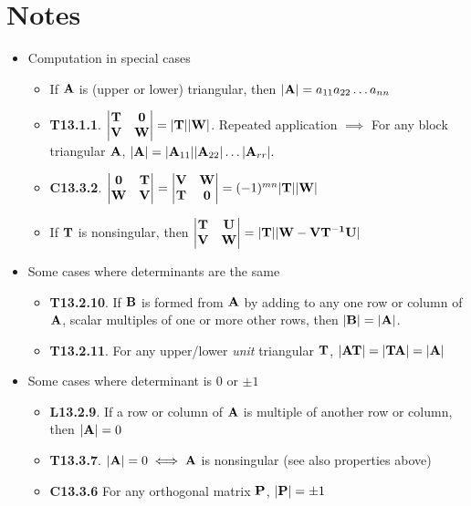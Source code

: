 \documentclass[a4paper, oneside]{book}
\begin{document}
\section{Notes}
\begin{itemize}
\item Computation in special cases
	\begin{itemize}
	\item If $\mathbf{A}$ is (upper or lower) triangular, then $|\mathbf{A}|=a_{11}a_{22}\hdots a_{nn}$
	\item \textbf{T13.1.1}. $\left|\begin{matrix} \mathbf{T}  & \mathbf{0} \\\mathbf{V} & \mathbf{W} \end{matrix}\right|=\mathbf{|T||W|}$. Repeated application $\implies$ For any block triangular $\mathbf{A}$, $|\mathbf{A}|=|\mathbf{A}_{11}||\mathbf{A}_{22}|\hdots |\mathbf{A}_{rr}|.$
	\item \textbf{C13.3.2}. $\left|\begin{matrix} \mathbf{0}  & \mathbf{T} \\\mathbf{W} & \mathbf{V} \end{matrix}\right|=\left|\begin{matrix} \mathbf{V}  & \mathbf{W} \\\mathbf{T} & \mathbf{0} \end{matrix}\right|=(-1)^{mn}\mathbf{|T||W|}$ 
	\item If $\mathbf{T}$ is nonsingular, then $\left|\begin{matrix} \mathbf{T}  & \mathbf{U} \\\mathbf{V} & \mathbf{W} \end{matrix}\right|=\mathbf{|T||W-VT^{-1}U|}$	\end{itemize}
\item Some cases where determinants are the same
	\begin{itemize}
	\item \textbf{T13.2.10}. If $\mathbf{B}$ is formed from $\mathbf{A}$ by adding to any one row or column of $\mathbf{A}$, scalar multiples of one or more other rows, then $|\mathbf{B}|=|\mathbf{A}|$.
	\item \textbf{T13.2.11}. For any upper/lower \textit{unit} triangular $\mathbf{T}$, $\mathbf{|AT|=|TA|=|A|}$
	\end{itemize}
\item Some cases where determinant is $0$ or $\pm 1$
	\begin{itemize}
	\item \textbf{L13.2.9}. If a row or column of $\mathbf{A}$ is multiple of another row or column, then $|\mathbf{A}|=0$
	\item \textbf{T13.3.7}. $|\mathbf{A}|=0 \iff \mathbf{A}$ is nonsingular (see also properties above)
	\item \textbf{C13.3.6} For any orthogonal matrix $\mathbf{P}$, $|\mathbf{P}|=\pm 1$
	\end{itemize}
\end{itemize}
\end{document}
